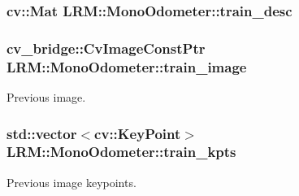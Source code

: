 \hypertarget{classLRM_1_1MonoOdometer_aae6c2096b1b0c785548bc57cf6557427}{
\subsubsection[{train\-\_\-desc}]{\setlength{\rightskip}{0pt plus 5cm}cv\-::\-Mat {\bf \-L\-R\-M\-::\-Mono\-Odometer\-::train\-\_\-desc}}}\label{classLRM_1_1MonoOdometer_aae6c2096b1b0c785548bc57cf6557427}
\hypertarget{classLRM_1_1MonoOdometer_a91ee6e52006559ba0f769a2ccc06fa64}{
\subsubsection[{train\-\_\-image}]{\setlength{\rightskip}{0pt plus 5cm}cv\-\_\-bridge\-::\-Cv\-Image\-Const\-Ptr {\bf \-L\-R\-M\-::\-Mono\-Odometer\-::train\-\_\-image}}}\label{classLRM_1_1MonoOdometer_a91ee6e52006559ba0f769a2ccc06fa64}


\-Previous image. 

\hypertarget{classLRM_1_1MonoOdometer_a98515916ee97beaefb9bbcf07cd02d1b}{
\subsubsection[{train\-\_\-kpts}]{\setlength{\rightskip}{0pt plus 5cm}std\-::vector$<$cv\-::\-Key\-Point$>$ {\bf \-L\-R\-M\-::\-Mono\-Odometer\-::train\-\_\-kpts}}}\label{classLRM_1_1MonoOdometer_a98515916ee97beaefb9bbcf07cd02d1b}


\-Previous image keypoints. 

